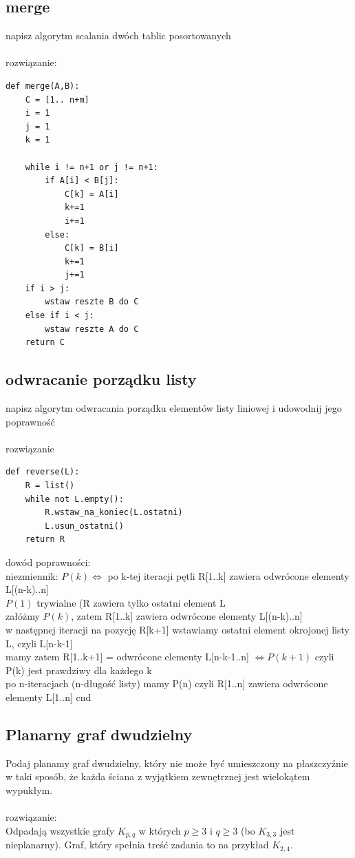 \documentclass{article}
\begin{document}
\subsection*{merge}
napisz algorytm scalania dwóch tablic posortowanych \\\\ rozwiązanie:
\begin{lstlisting}
def merge(A,B):
	C = [1.. n+m]
	i = 1 
	j = 1
	k = 1
	
	while i != n+1 or j != n+1:
		if A[i] < B[j]:
			C[k] = A[i]
			k+=1
			i+=1 
		else:
			C[k] = B[i]
			k+=1
			j+=1
	if i > j:
		wstaw reszte B do C
	else if i < j:
		wstaw reszte A do C
	return C
\end{lstlisting}

\subsection*{odwracanie porządku listy}
napisz algorytm odwracania porządku elementów listy liniowej i udowodnij jego poprawność \\\\
rozwiązanie \\
\begin{lstlisting}
def reverse(L):
	R = list()
	while not L.empty():
		R.wstaw_na_koniec(L.ostatni)
		L.usun_ostatni()
	return R
\end{lstlisting}
dowód poprawności: \\
niezmiennik: $P(k) \iff $  po k-tej iteracji pętli R[1..k] zawiera odwrócone elementy L[(n-k)..n] \\
$P(1)$ trywialne (R zawiera tylko ostatni element L \\
załóżmy $P(k)$, zatem R[1..k] zawiera odwrócone elementy L[(n-k)..n] \\
w następnej iteracji na pozycję R[k+1] wstawiamy ostatni element okrojonej listy L, czyli L[n-k-1] \\
mamy zatem R[1..k+1] = odwrócone elementy L[n-k-1..n] $\iff P(k+1)$ czyli P(k) jest prawdziwy dla każdego k \\
po n-iteracjach (n-długość listy) mamy P(n) czyli R[1..n] zawiera odwrócone elementy L[1..n] cnd

\subsection*{Planarny graf dwudzielny}
Podaj planamy graf dwudzielny, który nie może być umieszczony na płaszczyźnie w taki sposób, że każda ściana z wyjątkiem zewnętrznej jest wielokątem wypukłym. \\\\rozwiązanie:\\
Odpadają wszystkie grafy $K_{p,q}$ w których $p\geq 3$ i $q \geq 3$ (bo $K_{3,3}$ jest nieplanarny). Graf, który spełnia treść zadania to na przykład $K_{2,4}$.
\end{document}
